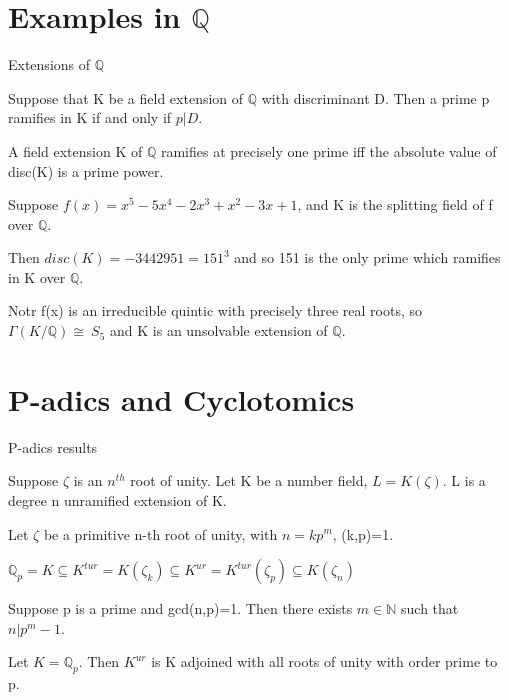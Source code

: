 \documentclass[10pt]{beamer}
\theoremstyle{plain} %
\begin{document}
\section{Examples in $\mathbb{Q}$}
\begin{frame}{Extensions of $\mathbb{Q}$}
    \begin{theorem}
     Suppose that K be a field extension of $\mathbb{Q}$ with discriminant D. Then a prime p
ramifies in K if and only if $p|D$.   
    \end{theorem}
    \begin{corollary}
A field extension K of $\mathbb{Q}$ ramifies at precisely one prime iff the absolute value of disc(K) is a prime power.
\end{corollary}
\begin{example}
    Suppose $f(x)=x^5-5x^4-2x^3+x^2-3x+1$, and K is the splitting field of f over $\mathbb{Q}$. \par Then $disc(K)=-3442951=151^3$ and so 151 is the only prime which ramifies in K over $\mathbb{Q}$. \par Notr f(x) is an irreducible quintic with precisely three real roots, so $\Gamma(K/\mathbb{Q})\cong\ S_5$ and K is an unsolvable extension of $\mathbb{Q}$.
\end{example}
\end{frame}
\section{P-adics and Cyclotomics}
\begin{frame}{P-adics results}

\begin{theorem}
   Suppose $\zeta$ is an $n^{th}$ root of unity. Let K be a number field, $L=K(\zeta)$. 
L is a degree n unramified extension of K. 
\end{theorem}

Let $\zeta$ be a primitive n-th root of unity, with $n=kp^{m}$, (k,p)=1.
\begin{example}
      $\mathbb{Q}_{p}=K\subseteq K^{tur}=K(\zeta_k)\subseteq K^{ur} = K^{tur}(\zeta_{p})\subseteq K(\zeta_n)$
\end{example}
\begin{lemma}
Suppose p is a prime and gcd(n,p)=1. Then there exists $m\in\mathbb{N}$ such that $n|p^m-1$.
\end{lemma}
\begin{theorem}
    Let $K=\mathbb{Q}_p$. Then $K^{ur}$ is K adjoined with all roots of unity with order prime to p. 
\end{theorem}

\end{frame}
\end{document}
